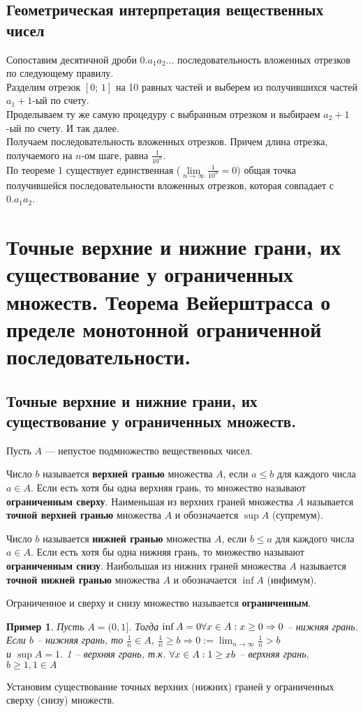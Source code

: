 \documentclass[12pt]{article}
\newtheorem{example}[theorem]{Пример}
\theoremstyle{definition}
\begin{document}
\subsection{Геометрическая интерпретация вещественных чисел}
Сопоставим десятичной дроби $0.a_1a_2...$ последовательность вложенных отрезков по следующему правилу. \\
Разделим отрезок $[0;\, 1]$ на 10 равных частей и выберем из получившихся частей $a_1+1$-ый по счету.\\
Проделываем ту же самую процедуру с выбранным отрезком и выбираем $a_2+1$-ый по счету. И так далее.\\
Получаем последовательность вложенных отрезков. Причем длина отрезка, получаемого на $n$-ом шаге, равна $\frac{1}{10^n}$. \\
По теореме 1 существует единственная ($\lim\limits_{n\to\infty} \frac{1}{10^n} = 0$) общая точка получившейся последовательности вложенных отрезков, которая совпадает с $0.a_1a_2$.

\section{Точные верхние и нижние грани, их существование у ограниченных множеств. Теорема Вейерштрасса о пределе монотонной ограниченной последовательности.}
\subsection{Точные верхние и нижние грани, их существование у ограниченных множеств.}
Пусть $A$ --- непустое подмножество вещественных чисел.

Число $b$ называется {\bf верхней гранью} множества $A$,
если $a\le b$ для каждого числа $a\in A$.
Если есть хотя бы одна верхняя грань, то множество называют {\bf ограниченным сверху}.
Наименьшая из верхних граней множества $A$ называется {\bf точной верхней гранью} множества $A$
и обозначается $\sup A$ (супремум).

Число $b$ называется {\bf нижней гранью} множества $A$,
если $b\le a$ для каждого числа $a\in A$.
Если есть хотя бы одна нижняя грань, то множество называют {\bf ограниченным снизу}.
Наибольшая из нижних граней множества $A$ называется {\bf точной нижней гранью} множества $A$
и обозначается $\inf A$ (инфимум).

Ограниченное и сверху и снизу множество называется {\bf ограниченным}.
\begin{example}
{\rm
Пусть $A=(0,1]$.
Тогда $\inf A = 0 \\ \forall x \in A: x \geq 0 \Rightarrow 0$ -- нижняя грань. Если $b$ -- нижняя грань, то $\frac{1}{n} \in A,\ \frac{1}{n} \geq b \Rightarrow 0 := \lim_{n\to\infty}\frac{1}{n} > b$ \\ 
и $\sup A = 1$. 1 -- верхняя грань, т.к. $\forall x \in A: 1 \geq x \\ b$ -- верхняя грань, $b \geq 1, 1\in A$
}\end{example}
Установим существование точных верхних (нижних)
граней у ограниченных сверху (снизу) множеств.
\end{document}
